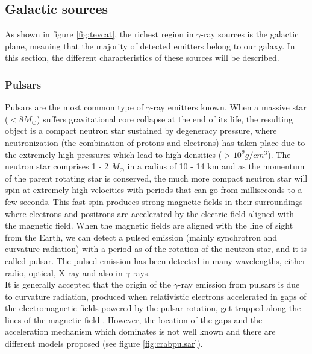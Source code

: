 \documentclass[main.tex]{subfiles}
\begin{document}
\subsection{Galactic sources}

As shown in figure \ref{fig:tevcat}, the richest region in $\gamma$-ray sources is the galactic plane, meaning that the majority of detected emitters belong to our galaxy. In this section, the different characteristics of these sources will be described. 

\subsubsection{Pulsars} \label{sec:pulsars}

Pulsars are the most common type of $\gamma$-ray emitters known. When a massive star ($< 8 M_{\odot}$) suffers gravitational core collapse at the end of its life, the resulting object is a compact neutron star sustained by degeneracy pressure, where neutronization (the combination of protons and electrons) has taken place due to the extremely high pressures which lead to high densities ($> 10^{9}g/cm^{3}$). The neutron star comprises 1 - 2 $M_{\odot}$ in a radius of 10 - 14 km and as the momentum of the parent rotating star is conserved, the much more compact neutron star will spin at extremely high velocities  with periods  that can go from milliseconds to a few seconds. This fast spin produces strong magnetic fields in their surroundings where electrons and positrons are accelerated by the electric field aligned with the magnetic field. When the magnetic fields are aligned with the line of sight from the Earth, we can detect a pulsed emission (mainly synchrotron and curvature radiation) with a period as of the rotation of the neutron star, and it is called pulsar. The pulsed emission has been detected in many wavelengths, either radio, optical, X-ray and also in $\gamma$-rays.\\ 
It is generally accepted that the origin of the $\gamma$-ray emission from pulsars is due to curvature radiation, produced when relativistic electrons accelerated in gaps of the electromagnetic fields powered by the pulsar rotation,  get trapped along the lines of the magnetic field \cite{2008crabmagic}. However, the location of the gaps and the acceleration mechanism which dominates is not well known and there are different models proposed (see figure \ref{fig:crabpulsar}).\\ 
\end{document}
